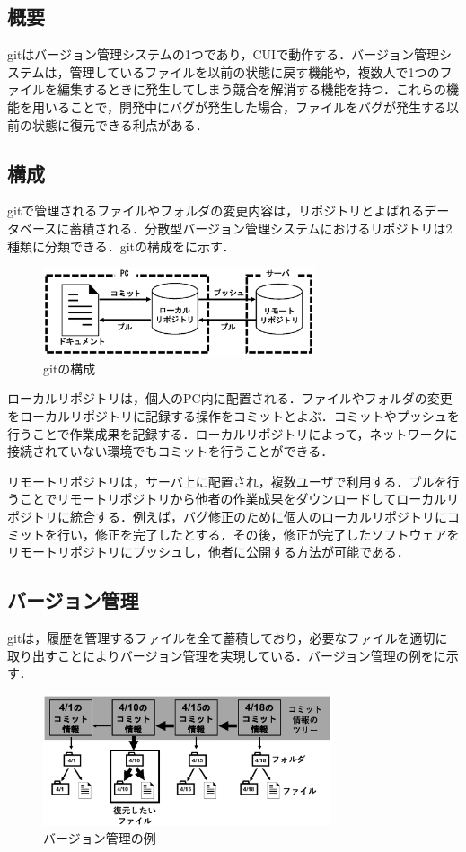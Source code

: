 \documentclass[a4j,9pt,twocolumn]{jsarticle}
\begin{document}
\subsection{概要}
gitはバージョン管理システムの1つであり，CUIで動作する．バージョン管理システムは，管理しているファイルを以前の状態に戻す機能や，複数人で1つのファイルを編集するときに発生してしまう競合を解消する機能を持つ．これらの機能を用いることで，開発中にバグが発生した場合，ファイルをバグが発生する以前の状態に復元できる利点がある\cite{pop}．

\subsection{構成}
gitで管理されるファイルやフォルダの変更内容は，リポジトリとよばれるデータベースに蓄積される．分散型バージョン管理システムにおけるリポジトリは2種類に分類できる．gitの構成をに示す．

\begin{figure}[h]
\centering
\includegraphics[width=80mm]{img/git.eps}
\caption{gitの構成}
\label{git}
\end{figure}

ローカルリポジトリは，個人のPC内に配置される．ファイルやフォルダの変更をローカルリポジトリに記録する操作をコミットとよぶ．コミットやプッシュを行うことで作業成果を記録する．ローカルリポジトリによって，ネットワークに接続されていない環境でもコミットを行うことができる．

リモートリポジトリは，サーバ上に配置され，複数ユーザで利用する．プルを行うことでリモートリポジトリから他者の作業成果をダウンロードしてローカルリポジトリに統合する．例えば，バグ修正のために個人のローカルリポジトリにコミットを行い，修正を完了したとする．その後，修正が完了したソフトウェアをリモートリポジトリにプッシュし，他者に公開する方法が可能である．

\subsection{バージョン管理}
gitは，履歴を管理するファイルを全て蓄積しており，必要なファイルを適切に取り出すことによりバージョン管理を実現している．バージョン管理の例をに示す．

\begin{figure}[h]
\centering
\includegraphics[width=85mm]{img/tree.eps}
\caption{バージョン管理の例}
\label{tree}
\end{figure}
\end{document}

